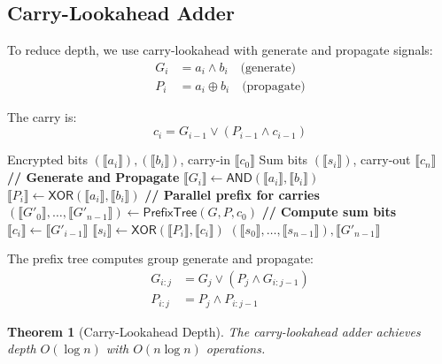 \documentclass[11pt,a4paper]{article}
\newtheorem{theorem}{Theorem}[section]
\begin{document}
\subsection{Carry-Lookahead Adder}

To reduce depth, we use carry-lookahead with generate and propagate signals:
\begin{align}
G_i &= a_i \land b_i \quad \text{(generate)} \\
P_i &= a_i \oplus b_i \quad \text{(propagate)}
\end{align}

The carry is:
\begin{equation}
c_i = G_{i-1} \lor (P_{i-1} \land c_{i-1})
\end{equation}

\begin{algorithm}
\caption{Carry-Lookahead Adder}
\begin{algorithmic}[1]
\Require Encrypted bits $(\llbracket a_i \rrbracket), (\llbracket b_i \rrbracket)$, carry-in $\llbracket c_0 \rrbracket$
\Ensure Sum bits $(\llbracket s_i \rrbracket)$, carry-out $\llbracket c_n \rrbracket$
\State \textbf{// Generate and Propagate}
    \State $\llbracket G_i \rrbracket \gets \textsf{AND}(\llbracket a_i \rrbracket, \llbracket b_i \rrbracket)$
    \State $\llbracket P_i \rrbracket \gets \textsf{XOR}(\llbracket a_i \rrbracket, \llbracket b_i \rrbracket)$
\EndFor
\State \textbf{// Parallel prefix for carries}
\State $(\llbracket G'_0 \rrbracket, \ldots, \llbracket G'_{n-1} \rrbracket) \gets \textsf{PrefixTree}(G, P, c_0)$
\State \textbf{// Compute sum bits}
    \State $\llbracket c_i \rrbracket \gets \llbracket G'_{i-1} \rrbracket$ 
    \State $\llbracket s_i \rrbracket \gets \textsf{XOR}(\llbracket P_i \rrbracket, \llbracket c_i \rrbracket)$
\EndFor
\State \Return $(\llbracket s_0 \rrbracket, \ldots, \llbracket s_{n-1} \rrbracket), \llbracket G'_{n-1} \rrbracket$
\end{algorithmic}
\end{algorithm}

The prefix tree computes group generate and propagate:
\begin{align}
G_{i:j} &= G_j \lor (P_j \land G_{i:j-1}) \\
P_{i:j} &= P_j \land P_{i:j-1}
\end{align}

\begin{theorem}[Carry-Lookahead Depth]
The carry-lookahead adder achieves depth $O(\log n)$ with $O(n \log n)$ operations.
\end{theorem}
\end{document}
